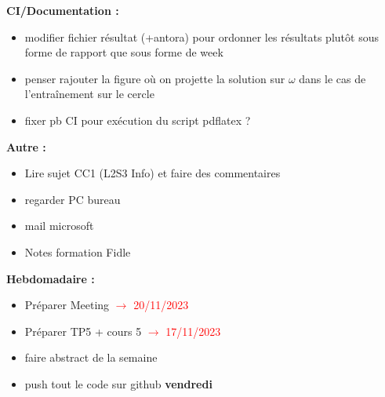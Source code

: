 \textbf{CI/Documentation :}
\begin{itemize}[label=$\square$] 
	\item[\later] modifier fichier résultat (+antora) pour ordonner les résultats plutôt sous forme de rapport que sous forme de week
	\item[\later] penser rajouter la figure où on projette la solution sur $\omega$ dans le cas de l'entraînement sur le cercle
	\item[\done] fixer pb CI pour exécution du script pdflatex ?
\end{itemize}
\textbf{Autre :}
\begin{itemize}[label=$\square$] 
	\item[\done] Lire sujet CC1 (L2S3 Info) et faire des commentaires
	\item[\done] regarder PC bureau
	\item[\done] mail microsoft
	\item[\later] Notes formation Fidle
\end{itemize}
\textbf{Hebdomadaire :}
\begin{itemize}[label=$\square$] 
	\item[\wontfix] Préparer Meeting \textcolor{red}{$\rightarrow$ 20/11/2023}
	\item[\done] Préparer TP5 + cours 5 \textcolor{red}{$\rightarrow$ 17/11/2023}
	\item[\done] faire abstract de la semaine 
	\item[\done] push tout le code sur github \textbf{vendredi}
\end{itemize}